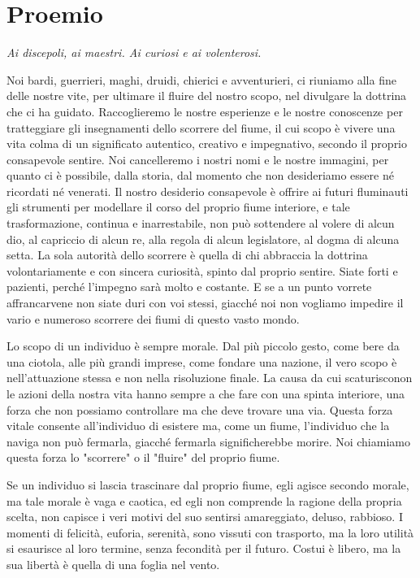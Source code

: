 \chapter*{Proemio}

\textit{Ai discepoli, ai maestri. Ai curiosi e ai volenterosi.}

Noi bardi, guerrieri, maghi, druidi, chierici e avventurieri, ci riuniamo alla fine delle nostre vite, per ultimare il fluire del nostro scopo, nel divulgare la dottrina che ci ha guidato. Raccoglieremo le nostre esperienze e le nostre conoscenze per tratteggiare gli insegnamenti dello scorrere del fiume, il cui scopo è vivere una vita colma di un significato autentico, creativo e impegnativo, secondo il proprio consapevole sentire.
Noi cancelleremo i nostri nomi e le nostre immagini, per quanto ci è possibile, dalla storia, dal momento che non desideriamo essere né ricordati né venerati. Il nostro desiderio consapevole è offrire ai futuri fluminauti gli strumenti per modellare il corso del proprio fiume interiore, e tale trasformazione, continua e inarrestabile, non può sottendere al volere di alcun dio, al capriccio di alcun re, alla regola di alcun legislatore, al dogma di alcuna setta. La sola autorità dello scorrere è quella di chi abbraccia la dottrina volontariamente e con sincera curiosità, spinto dal proprio sentire. Siate forti e pazienti, perché l’impegno sarà molto e costante. E se a un punto vorrete affrancarvene non siate duri con voi stessi, giacché noi non vogliamo impedire il vario e numeroso scorrere dei fiumi di questo vasto mondo.

Lo scopo di un individuo è sempre morale. Dal più piccolo gesto, come bere da una ciotola, alle più grandi imprese, come fondare una nazione, il vero scopo è nell'attuazione stessa e non nella risoluzione finale. La causa da cui scaturisconon le azioni della nostra vita hanno sempre a che fare con una spinta interiore, una forza che non possiamo controllare ma che deve trovare una via. Questa forza vitale consente all'individuo di esistere ma, come un fiume, l'individuo che la naviga non può fermarla, giacché fermarla significherebbe morire. Noi chiamiamo questa forza lo "scorrere" o il "fluire" del proprio fiume.

Se un individuo si lascia trascinare dal proprio fiume, egli agisce secondo morale, ma tale morale è vaga e caotica, ed egli non comprende la ragione della propria scelta, non capisce i veri motivi del suo sentirsi amareggiato, deluso, rabbioso. I momenti di felicità, euforia, serenità, sono vissuti con trasporto, ma la loro utilità si esaurisce al loro termine, senza fecondità per il futuro. Costui è libero, ma la sua libertà è quella di una foglia nel vento.

